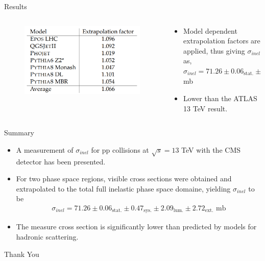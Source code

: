 \documentclass[aspectratio=169,xcolor=dvipsnames]{beamer}
\begin{document}
\begin{frame}{Results}
	\begin{columns}
	\begin{column}{.5\textwidth}
		\begin{figure}
			\centering
			\includegraphics[width=0.8\linewidth]{screenshot008}
		\end{figure}
	\end{column}
	\begin{column}{.5\textwidth}
		\begin{itemize}
			\item Model dependent extrapolation factors are applied, thus giving $\sigma_{inel}$ as, \\[0.15in]
			$\sigma_{inel} = 71.26 \pm 0.06_\text{stat.} \pm 0.47_\text{sys.} \pm 2.09_\text{lum.} \pm 2.72_\text{ext.} $ mb 
			\vspace{0.15in}
			\item Lower than the ATLAS 13 TeV result.
		\end{itemize}
	\end{column}
\end{columns}
\end{frame}

\begin{frame}{Summary}
	\begin{itemize}
		\item A measurement of $\sigma_{inel}$ for pp collisions at $\sqrt{s} = 13 $ TeV with the CMS detector has been presented.
		\item For two phase space regions, visible cross sections were obtained and extrapolated to the total full inelastic phase space domaine, yielding $\sigma_{inel}$ to be 
		\begin{align*}
			\sigma_{inel} = 71.26 \pm 0.06_\text{stat.} \pm 0.47_\text{sys.} \pm 2.09_\text{lum.} \pm 2.72_\text{ext.}  \text{ mb}
		\end{align*}
		\item The measure cross section is significantly lower than predicted by models for hadronic scattering.
	\end{itemize}
\end{frame}

\begin{frame}
    \Huge{\centerline{Thank You}}
\end{frame}

\end{document}
